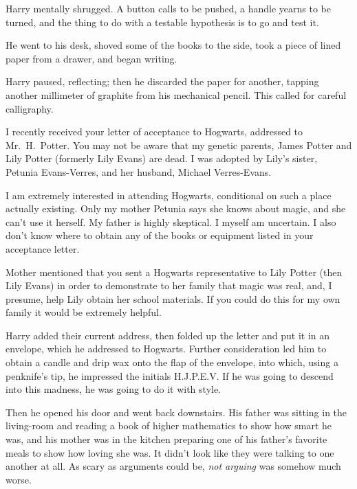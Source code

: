 Harry mentally shrugged. A button calls to be pushed, a
handle yearns to be turned, and the thing to do with a
testable hypothesis is to go and test it.

He went to his desk, shoved some of the books to the
side, took a piece of lined paper from a drawer, and began writing.

\begin{writtenNote}
\end{writtenNote}

Harry paused, reflecting; then he discarded the paper for another, tapping another millimeter of graphite from his mechanical pencil. This called for careful calligraphy.

\begin{writtenNote}


I recently received your letter of acceptance to Hogwarts, addressed to Mr.~H.~Potter. You may not be aware that my genetic parents, James Potter and Lily Potter (formerly Lily Evans) are dead. I was adopted by Lily's sister, Petunia Evans-Verres, and her husband, Michael Verres-Evans.

I am extremely interested in attending Hogwarts, conditional on such a place actually existing. Only my mother Petunia says she knows about magic, and she can't use it herself. My father is highly skeptical. I myself am uncertain. I also don't know where to obtain any of the books or equipment listed in your acceptance letter.

Mother mentioned that you sent a Hogwarts representative to Lily Potter (then Lily Evans) in order to demonstrate to her family that magic was real, and, I presume, help Lily obtain her school materials. If you could do this for my own family it would be extremely helpful.

\end{writtenNote}

Harry added their current address, then folded up the letter and put it in an envelope, which he addressed to Hogwarts. Further consideration led him to obtain a candle and drip wax onto the flap of the envelope, into which, using a penknife's tip, he impressed the initials H.J.P.E.V\@. If he was going to descend into this madness, he was going to do it with style.

Then he opened his door and went back downstairs. His
father was sitting in the living-room and reading a book of
higher mathematics to show how smart he was, and his mother
was in the kitchen preparing one of his father's favorite
meals to show how loving she was. It didn't look like they
were talking to one another at all. As scary as arguments
could be, \emph{not arguing} was somehow much worse.

